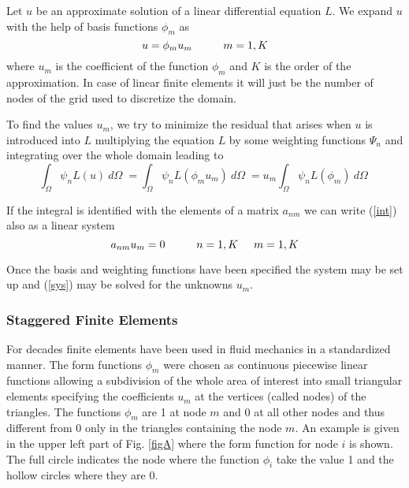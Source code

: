 Let $u$ be an approximate solution of a linear differential
equation $L$. We expand $u$ with the help of basis functions $\phi_{m}$
as
\begin{equation}
\label{exp}
	u=\phi_{m} u_{m} \mbox{\hspace{1cm}} m=1,K
\end{equation}
where $u_{m}$ is the coefficient of the function $\phi_{m}$ and $K$
is the order of the approximation.
In case of linear finite
elements it will just be the number of nodes of the grid used to
discretize the domain.

To find the values $u_{m}$, we try to minimize the residual
that arises when $u$ is introduced into $L$ multiplying the equation $L$
by some weighting functions $\Psi_{n}$ and
integrating over the whole domain leading to
\begin{equation}
\label{int}
\int_{\Omega} \psi_{n} L(u) \: d\Omega \; = 
\int_{\Omega} \psi_{n} L(\phi_{m} u_{m}) \: d\Omega \;
= u_{m} \int_{\Omega} \psi_{n} L(\phi_{m}) \: d\Omega \;
\end{equation}

If the integral is identified with the elements of a matrix $a_{nm}$
we can write (\ref{int}) also as a linear system
\begin{equation} \label{sys}
	a_{nm}u_{m} = 0 \mbox{\hspace{1cm}} n=1,K \hspace{0.5cm} m=1,K
\end{equation}

Once the basis and weighting functions have been specified the system
may be set up and (\ref{sys}) may be solved for the unknowns $u_{m}$.






\subsubsection{Staggered Finite Elements}

For decades finite elements have been used in fluid mechanics in
a standardized manner.
The form functions $\phi_{m}$ were chosen as continuous piecewise linear
functions allowing a subdivision of the whole area of interest into small
triangular elements specifying the coefficients $u_{m}$ at the vertices
(called nodes)
of the triangles. The functions $\phi_{m}$ are 1 at node
$m$ and 0 at all other nodes and thus different from 0 only in the
triangles containing the node $m$.
An example is given in the upper left part of Fig. \ref{figA}
where the form function for node $i$ is shown. The full circle indicates
the node where the function $\phi_{i}$ take the value
1 and the hollow circles where they are 0.


